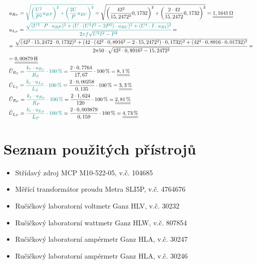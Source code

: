 \documentclass[a4paper, czech]{article}
\begin{document}
\begin{enumerate}
\begin{multline*}
        \ \ \ u_{R_P} = \textcolor{teal}{\sqrt{\left(\frac{U^2}{P^2}u_{BP}\right)^2 + \left(\frac{2U}{P}u_{BU}\right)^2}} = \sqrt{\left(\frac{42^2}{15,2472^2}0,1732\right)^2 + \left(\frac{2 \cdot 42}{15,2472}0,1732\right)^2} = \underline{\underline{1,1641\,\Omega}} \hfill \\
        \ \ \ u_{L_P} = \textcolor{teal}{\cfrac{\sqrt{(U^2 \cdot P \cdot u_{BP})^2 + (U \cdot (U^2I^2 - 2P^2) \cdot u_{BU})^2 + (U^4\cdot I \cdot u_{BI})^2}}{2 \pi f \sqrt{U^2I^2-P^2}}} = \hfill \\
        \ \ \ = \cfrac{\sqrt{(42^2 \cdot 15,2472 \cdot 0,1732)^2 + (42 \cdot (42^2 \cdot 0,8916^2 - 2 \cdot 15,2472^2) \cdot 0,1732)^2 + (42^4\cdot 0,8916 \cdot 0,01732)^2}}{2 \pi 50 \cdot \sqrt{42^2 \cdot 0,8916^2-15,2472^2}} = \hfill \\
        \ \ \ = \underline{\underline{0,00879\,\text{H}}} \hfill \\
        \ \ \ \tilde{U}_{R_S} = \textcolor{teal}{\frac{k_r \cdot u_{R_S}}{R_S} \cdot 100\,\%} = \frac{2 \cdot 0,7764}{17,67} \cdot 100\,\% = \underline{\underline{8,1\,\%}} \hfill \\
        \ \ \ \tilde{U}_{L_S} = \textcolor{teal}{\frac{k_r \cdot u_{L_S}}{L_S} \cdot 100\,\%} = \frac{2 \cdot 0,00258}{0,135} \cdot 100\,\% = \underline{\underline{3,3\,\%}} \hfill \\
        \ \ \ \tilde{U}_{R_P} = \textcolor{teal}{\frac{k_r \cdot u_{R_P}}{R_P} \cdot 100\,\%} = \frac{2 \cdot 1,624}{120} \cdot 100\,\% = \underline{\underline{2,81\,\%}} \hfill \\
        \ \ \ \tilde{U}_{L_P} = \textcolor{teal}{\frac{k_r \cdot u_{L_P}}{L_P} \cdot 100\,\%} = \frac{2 \cdot 0,003879}{0,159} \cdot 100\,\% = \underline{\underline{4,73\,\%}} \hfill
    \end{multline*}
\end{enumerate}

\pagebreak

\section{Seznam použitých přístrojů}

\begin{itemize}
    \item Střídavý zdroj MCP M10-522-05, v.č. 104685
    \item Měřící transformátor proudu Metra SLI5P, v.č. 4764676
    \item Ručičkový laboratorní voltmetr Ganz HLV, v.č. 30232
    \item Ručičkový laboratorní wattmetr Ganz HLW, v.č. 807854
    \item Ručičkový laboratorní ampérmetr Ganz HLA, v.č. 30247
    \item Ručičkový laboratorní ampérmetr Ganz HLA, v.č. 30246
\end{itemize}
\end{document}
